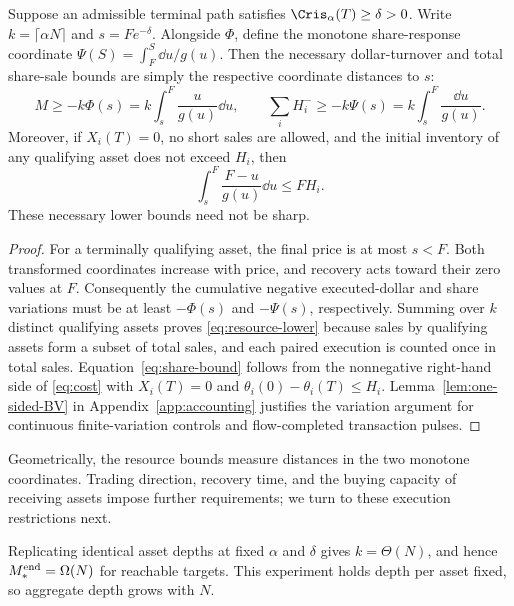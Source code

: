 \documentclass[review,hidelinks,onefignum,onetabnum]{siamonline250211}
\begin{document}
\begin{theorem}\label{thm:resource}
Suppose an admissible terminal path satisfies $\Cris_\alpha(T)\ge\delta>0$. Write $k=\lceil\alpha N\rceil$ and $s=Fe^{-\delta}$. Alongside $\Phi$, define the monotone share-response coordinate $\Psi(S)=\int_F^S\dd u/g(u)$. Then the necessary dollar-turnover and total share-sale bounds are simply the respective coordinate distances to $s$:
\begin{equation}\label{eq:resource-lower}
M\ge -k\Phi(s)=k\int_s^F\frac{u}{g(u)}\dd u,\qquad
\sum_iH_i^-\ge -k\Psi(s)=k\int_s^F\frac{\dd u}{g(u)}.
\end{equation}
Moreover, if $X_i(T)=0$, no short sales are allowed, and the initial inventory of any qualifying asset does not exceed $H_i$, then
\begin{equation}\label{eq:share-bound}
\int_s^F\frac{F-u}{g(u)}\dd u\le FH_i.
\end{equation}
These necessary lower bounds need not be sharp.
\end{theorem}
\begin{proof}
For a terminally qualifying asset, the final price is at most $s<F$. Both transformed coordinates increase with price, and recovery acts toward their zero values at $F$. Consequently the cumulative negative executed-dollar and share variations must be at least $-\Phi(s)$ and $-\Psi(s)$, respectively. Summing over $k$ distinct qualifying assets proves \eqref{eq:resource-lower} because sales by qualifying assets form a subset of total sales, and each paired execution is counted once in total sales. Equation~\eqref{eq:share-bound} follows from the nonnegative right-hand side of \eqref{eq:cost} with $X_i(T)=0$ and $\theta_i(0)-\theta_i(T)\le H_i$. Lemma~\ref{lem:one-sided-BV} in Appendix~\ref{app:accounting}
justifies the variation argument for continuous finite-variation
controls and flow-completed transaction pulses.
\end{proof}

Geometrically, the resource bounds measure distances in the two monotone coordinates. Trading direction, recovery time, and the buying capacity of receiving assets impose further requirements; we turn to these execution restrictions next.

Replicating identical asset depths at fixed $\alpha$ and $\delta$ gives $k=\Theta(N)$, and hence $M_*^{\rm end}=\Omega(N)$ for reachable targets. This experiment holds depth per asset fixed, so aggregate depth grows with $N$.
\end{document}
